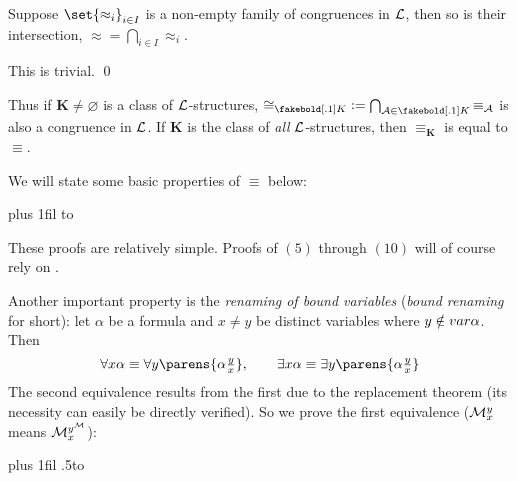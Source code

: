     Suppose $\set{\approx_i}_{i\in I}$ is a non-empty family of congruences in ${\cal L}$, then so is their intersection, ${\approx}=\bigcap_{i\in I}{\approx_i}$.

\eprop

This is trivial.
\qed

Thus if $\boldsymbol K\neq\varnothing$ is a class of ${\cal L}$-structures, ${\cong_{\boldsymbol K}}\coloneqq\bigcap_{{\cal A}\in\boldsymbol K}{\equiv_{\cal A}}$ is also a congruence in ${\cal L}$.
If $\boldsymbol K$ is the class of {\it all} ${\cal L}$-structures, then ${\equiv_{\boldsymbol K}}$ is equal to $\equiv$.

We will state some basic properties of $\equiv$ below:

\medskip
\tabskip=0pt plus 1fil
\halign to

These proofs are relatively simple.
Proofs of $(5)$ through $(10)$ will of course rely on .

Another important property is the {\it renaming of bound variables} ({\it bound renaming} for short): let $\alpha$ be a formula and $x\neq y$ be distinct variables where $y\notin{\sl var}\alpha$.
Then
$$ \forall x\alpha\equiv\forall y\parens{\alpha\tfrac yx},\qquad \exists x\alpha\equiv\exists y\parens{\alpha\tfrac yx} $$
The second equivalence results from the first due to the replacement theorem (its necessity can easily be directly verified).
So we prove the first equivalence (${\cal M}^y_x$ means ${\cal M}^{y^{\cal M}}_x$):

\medskip
\tabskip=0pt plus 1fil
{\openup.5\jot\halign to}
\medskip

